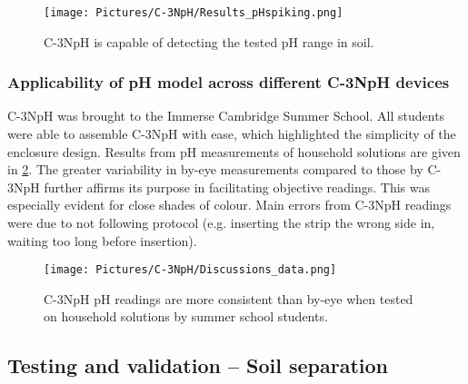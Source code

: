 	\begin{figure}[h!]
		\centering
	\texttt{[image: Pictures/C-3NpH/Results\_pHspiking.png]}
	\captionsetup{justification = centering}
	\caption{C-3NpH is capable of detecting the tested pH range in soil.}
	\label{fig:pHspike}
	\end{figure}

\subsubsection{Applicability of pH model across different C-3NpH devices} \label{para:immerse}
C-3NpH was brought to the Immerse Cambridge Summer School. All students were able to assemble C-3NpH with ease, which highlighted the simplicity of the enclosure design. Results from pH measurements of household solutions are given in \cref{fig:summerdata}. The greater variability in by-eye measurements compared to those by C-3NpH further affirms its purpose in facilitating objective readings. This was especially evident for close shades of colour. Main errors from C-3NpH readings were due to not following protocol (e.g. inserting the strip the wrong side in, waiting too long before insertion).

\begin{figure}[h!]
	\centering
	\texttt{[image: Pictures/C-3NpH/Discussions\_data.png]}
	\captionsetup{justification = centering}
	\caption{C-3NpH pH readings are more consistent than by-eye when tested on household solutions by summer school students.}  	
	\label{fig:summerdata}
\end{figure}

\clearpage
\subsection{Testing and validation -- Soil separation}




